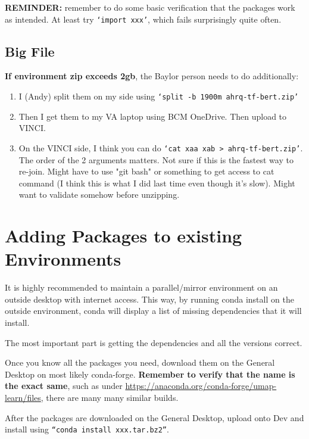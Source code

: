\documentclass[12pt]{article}
\theoremstyle{definition}
\begin{document}
\textbf{REMINDER:} remember to do some basic verification that the packages work as intended. At least try \texttt{`import xxx'}, which fails surprisingly quite often.

\subsection{Big File}
\textbf{If environment zip exceeds 2gb}, the Baylor person needs to do additionally:
\begin{enumerate}
    \item I (Andy) split them on my side using \texttt{`split -b 1900m ahrq-tf-bert.zip'} 
    \item Then I get them to my VA laptop using BCM OneDrive. Then upload to VINCI.
    \item On the VINCI side, I think you can do \texttt{`cat xaa xab > ahrq-tf-bert.zip'}. The order of the 2 arguments matters. Not sure if this is the fastest way to re-join. Might have to use "git bash" or something to get access to cat command (I think this is what I did last time even though it's slow). Might want to validate somehow before unzipping.
\end{enumerate}


\section{Adding Packages to existing Environments}
It is highly recommended to maintain a parallel/mirror environment on an outside desktop with internet access. This way, by running conda install on the outside environment, conda will display a list of missing dependencies that it will install. 

The most important part is getting the dependencies and all the versions correct. 

Once you know all the packages you need, download them on the General Desktop on most likely conda-forge. \textbf{Remember to verify that the name is the exact same}, such as under \url{https://anaconda.org/conda-forge/umap-learn/files}, there are many many similar builds.

After the packages are downloaded on the General Desktop, upload onto Dev and install using \texttt{``conda install xxx.tar.bz2''}.
\end{document}
